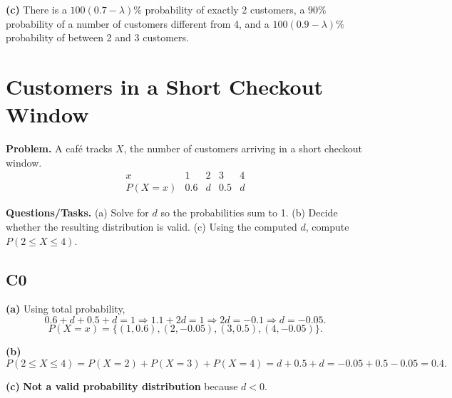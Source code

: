 		\textbf{(c)} There is a $100(0.7-\lambda)\%$ probability of exactly 2 customers, a $90\%$ probability of a number of customers different from 4, and a $100(0.9-\lambda)\%$ probability of between 2 and 3 customers.
		
		\section{Customers in a Short Checkout Window}
			\textbf{Problem.}
		A café tracks $X$, the number of customers arriving in a short checkout window.
		\[
		\begin{array}{c|cccc}
			x & 1 & 2 & 3 & 4\\
			\hline
			P(X=x) & 0.6 & d & 0.5 & d
		\end{array}
		\]
		
		\textbf{Questions/Tasks.}
		(a) Solve for $d$ so the probabilities sum to 1.
		(b) Decide whether the resulting distribution is valid.
		(c) Using the computed $d$, compute $P(2\le X\le 4)$.
		
		\subsection*{C0}

		\textbf{(a)} Using total probability,
		\[
		0.6+d+0.5+d=1\Rightarrow 1.1+2d=1\Rightarrow 2d=-0.1\Rightarrow d=-0.05.
		\]
		\[
		P(X=x)=\{(1,0.6),(2,-0.05),(3,0.5),(4,-0.05)\}.
		\]
		\begin{center}
		\end{center}
		

		\textbf{(b)}
		\[
		P(2\le X\le 4)=P(X=2)+P(X=3)+P(X=4)=d+0.5+d=-0.05+0.5-0.05=0.4.
		\]
		\begin{center}
		\end{center}
		\textbf{(c)} \textbf{Not a valid probability distribution} because $d<0$.

